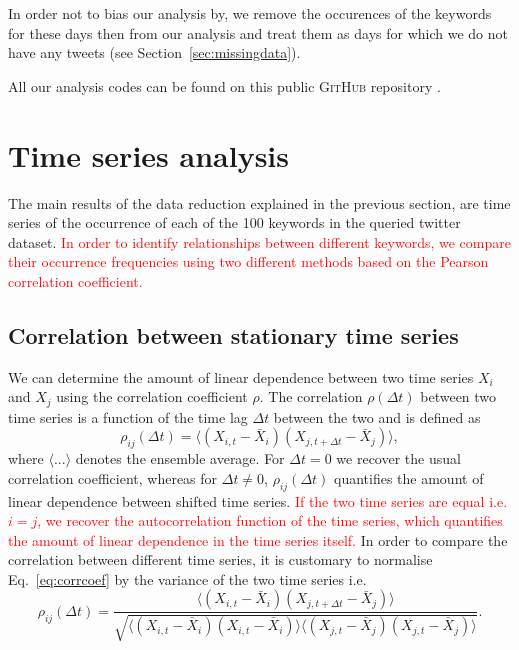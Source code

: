 \documentclass[12pt, a4paper]{article}
\begin{document}
In order not to bias our analysis by, we remove the occurences of the keywords for these days then from our analysis and treat them as days for which we do not have any tweets (see Section~\ref{sec:missingdata}).

All our analysis codes can be found on this public \textsc{GitHub} repository \cite{github}.

\section{Time series analysis}
The main results of the data reduction explained in the previous section, are time series of the occurrence of each of the 100 keywords in the queried twitter dataset. \textcolor{red}{In order to identify relationships between different keywords, we compare their occurrence frequencies using two different methods based on the Pearson correlation coefficient.} 

\subsection{Correlation between stationary time series}
We can determine the amount of linear dependence between two time series $X_{i}$ and $X_{j}$ using the correlation coefficient $\rho$. The correlation $\rho(\Delta t)$ between two time series is a function of the time lag $\Delta t$ between the two and is defined as \cite{dettling14}
\begin{equation}
\rho_{ij}(\Delta t) = \langle (X_{i, t}-\bar{X}_{i}) (X_{j, t+\Delta t}-\bar{X}_{j}) \rangle, \label{eq:corrcoef}
\end{equation} 
where $\langle ... \rangle$ denotes the ensemble average. For $\Delta t = 0$ we recover the usual correlation coefficient, whereas for $\Delta t \neq 0$, $\rho_{ij}(\Delta t)$ quantifies the amount of linear dependence between shifted time series. \textcolor{red}{If the two time series are equal i.e. $i = j$, we recover the autocorrelation function of the time series, which quantifies the amount of linear dependence in the time series itself.} In order to compare the correlation between different time series, it is customary to normalise Eq.~\ref{eq:corrcoef} by the variance of the two time series i.e. \cite{dettling14}
\begin{equation}
\rho_{ij}(\Delta t) = \frac{\langle (X_{i, t}-\bar{X}_{i}) (X_{j, t+\Delta t}-\bar{X}_{j}) \rangle}{\sqrt{\langle (X_{i, t}-\bar{X}_{i}) (X_{i, t}-\bar{X}_{i}) \rangle \langle (X_{j, t}-\bar{X}_{j}) (X_{j, t}-\bar{X}_{j}) \rangle}}. \label{eq:corrcoef1}
\end{equation} 
\end{document}
